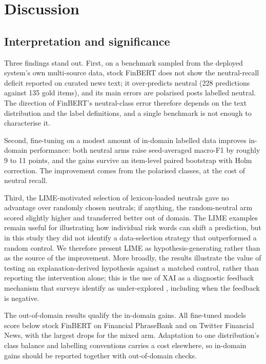 \documentclass{aims}
\numberwithin{equation}{section}
\begin{document}
\section{Discussion}\label{sec:discussion}
\subsection{Interpretation and significance}
Three findings stand out. First, on a benchmark sampled from the deployed system's
own multi-source data, stock FinBERT does not show the neutral-recall deficit
reported on curated news text; it over-predicts neutral (228 predictions against 135
gold items), and its main errors are polarised posts labelled neutral. The
direction of FinBERT's neutral-class error therefore depends on the text
distribution and the label definitions, and a single benchmark is not enough to
characterise it.

Second, fine-tuning on a modest amount of in-domain labelled data improves in-domain
performance: both neutral arms raise seed-averaged macro-F1 by roughly 9 to 11
points, and the gains survive an item-level paired bootstrap with Holm correction.
The improvement comes from the polarised classes, at the cost of neutral recall.

Third, the LIME-motivated selection of lexicon-loaded neutrals gave no advantage over
randomly chosen neutrals; if anything, the random-neutral arm scored slightly higher
and transferred better out of domain. The LIME examples remain useful for
illustrating how individual risk words can shift a prediction, but in this study
they did not identify a data-selection strategy that outperformed a random control.
We therefore present LIME as hypothesis-generating rather than as the source of the
improvement. More broadly, the results illustrate the value of testing an
explanation-derived hypothesis against a matched control, rather than reporting the
intervention alone; this is the use of XAI as a diagnostic feedback mechanism that
surveys identify as under-explored \citep{yeo2025}, including when the feedback is
negative.

The out-of-domain results qualify the in-domain gains. All fine-tuned models score
below stock FinBERT on Financial PhraseBank and on Twitter Financial News, with the
largest drops for the mixed arm. Adaptation to one distribution's class balance and
labelling conventions carries a cost elsewhere, so in-domain gains should be
reported together with out-of-domain checks.
\end{document}
